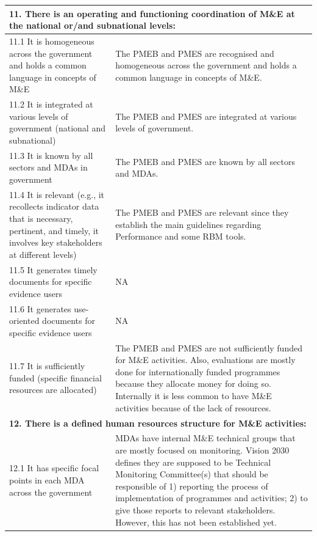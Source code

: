 \documentclass[
  10pt,
]{book}
\begin{document}
\begin{table}
\begin{tabular}[t]{l|l}
\hline
\multicolumn{2}{l}{\textbf{11. There is an operating and functioning coordination of M\&E at the national or/and subnational levels:}}\\
\hline
\hspace{1em}11.1 It is homogeneous across the government and holds a common language in concepts of M\&E & The PMEB and PMES are recognised and homogeneous across the government and holds a common language in concepts of M\&E.\\
\hline
\hspace{1em}11.2 It is integrated at various levels of government (national and subnational) & The PMEB and PMES are integrated at various levels of government.\\
\hline
\hspace{1em}11.3 It is known by all sectors and MDAs in government & The PMEB and PMES are known by all sectors and MDAs.\\
\hline
\hspace{1em}11.4 It is relevant (e.g., it recollects indicator data that is necessary, pertinent, and timely, it involves key stakeholders at different levels) & The PMEB and PMES are relevant since they establish the main guidelines regarding Performance and some RBM tools.\\
\hline
\hspace{1em}11.5 It generates timely documents for specific evidence users & NA\\
\hline
\hspace{1em}11.6 It generates use-oriented documents for specific evidence users & NA\\
\hline
\hspace{1em}11.7 It is sufficiently funded (specific financial resources are allocated) & The PMEB and PMES are not sufficiently funded for M\&E activities. Also, evaluations are mostly done for internationally funded programmes because they allocate money for doing so. Internally it is less common to have M\&E activities because of the lack of resources.\\
\hline
\multicolumn{2}{l}{\textbf{12. There is a defined human resources structure for M\&E activities:}}\\
\hline
\hspace{1em}12.1 It has specific focal points in each MDA across the government & MDAs have internal M\&E technical groups that are mostly focused on monitoring. Vision 2030 defines they are supposed to be Technical Monitoring Committee(s) that should be responsible of 1) reporting the process of implementation of programmes and activities; 2) to give those reports to relevant stakeholders. However, this has not been established yet.\\

\end{tabular}
\end{table}
\end{document}
